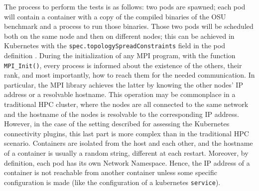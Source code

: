The process to perform the tests is as follows: two pods are spawned; each pod
will contain a container with a copy of the compiled binaries of the OSU
benchmark and a process to run those binaries. Those two pods will be scheduled
both on the same node and then on different nodes; this can be achieved in
Kubernetes with the \texttt{spec.topologySpreadConstraints} field in the pod
definition \cite{kdoc-topologyconstraints}. During the initialization of any MPI
program, with the function \texttt{MPI\_Init()}, every process is informed about
the existence of the others, their rank, and most importantly, how to reach them
for the needed communication. In particular, the MPI library achieves the latter
by knowing the other nodes' IP address or a resolvable hostname. This operation
may be commonplace in a traditional HPC cluster, where the nodes are all
connected to the same network and the hostname of the nodes is resolvable to the
corresponding IP address. However, in the case of the setting described for
assessing the Kubernetes connectivity plugins, this last part is more complex
than in the traditional HPC scenario. Containers are isolated from the host and
each other, and the hostname of a container is usually a random string,
different at each restart. Moreover, by definition, each pod has its own Network
Namespace. Hence, the IP address of a container is not reachable from another
container unless some specific configuration is made (like the configuration of
a kubernetes \texttt{service}).


